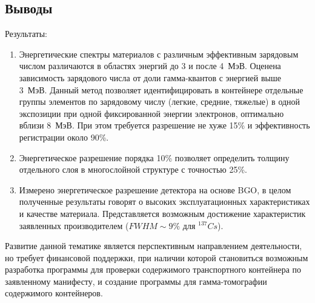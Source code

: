 \subsection{Выводы}
Результаты:   
\begin{enumerate}
    \item Энергетические спектры материалов с различным эффективным зарядовым числом различаются в областях энергий до 3 и после 4~МэВ. Оценена зависимость зарядового числа от доли гамма-квантов с энергией выше 3~МэВ. Данный метод позволяет идентифицировать в контейнере отдельные группы элементов по зарядовому числу (легкие, средние, тяжелые) в одной экспозиции при одной фиксированной энергии электронов, оптимально вблизи 8~МэВ. При этом требуется разрешение не хуже 15\% и эффективность регистрации около 90\%. 
    \item Энергетическое разрешение порядка 10\% позволяет определить толщину отдельного слоя в многослойной структуре с точностью 25\%.
    \item Измерено энергетическое разрешение детектора на основе BGO, в целом полученные результаты говорят о высоких эксплуатационных характеристиках и качестве материала. Представляется возможным достижение характеристик заявленных производителем ($FWHM \sim 9\%$ для $^{137}Cs$).
\end{enumerate}

Развитие данной тематике является перспективным направлением деятельности, но требует финансовой поддержки, при наличии которой становиться возможным разработка программы для проверки содержимого транспортного контейнера по заявленному манифесту, и создание программы для гамма-томографии содержимого контейнеров.

